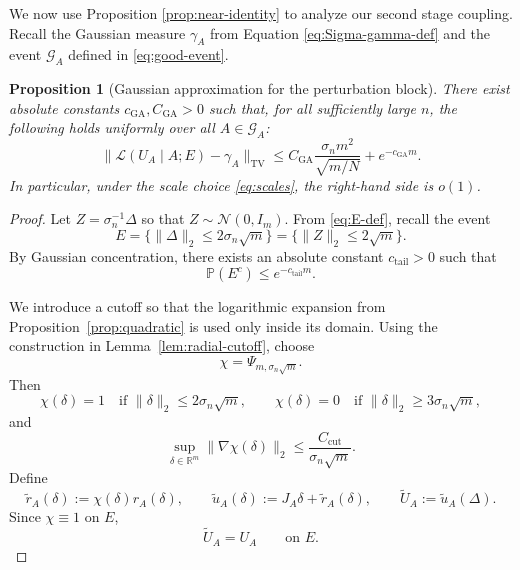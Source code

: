\documentclass[11pt, reqno]{amsart}
\numberwithin{equation}{section}
\newtheorem{proposition}{Proposition}
\theoremstyle{remark}
\newcommand{\R}{\mathbb{R}}
\newcommand{\Prob}{\mathbb{P}}
\newcommand{\1}{\mathbf{1}}
\newcommand{\Law}{\mathcal{L}}
\newcommand{\TV}{\mathrm{TV}}
\begin{document}
We now use Proposition \ref{prop:near-identity} to analyze our second stage coupling. Recall the Gaussian measure $\gamma_{A}$ from Equation \eqref{eq:Sigma-gamma-def} and the event $\mathcal G_A$ defined in \eqref{eq:good-event}.
\begin{proposition}[Gaussian approximation for the perturbation block]
\label{prop:gaussian-approx}
There exist absolute constants $c_{\mathrm{GA}},C_{\mathrm{GA}}>0$ such that, for all sufficiently large $n$, the following holds uniformly over all $A\in\mathcal G_A$:
\[
\|\Law(U_A\mid A;E)-\gamma_A\|_{\TV}
\le
C_{\mathrm{GA}}\frac{\sigma_n m^2}{\sqrt{m/N}}+e^{-c_{\mathrm{GA}}m}.
\]
In particular, under the scale choice \eqref{eq:scales}, the right-hand side is $o(1)$.
\end{proposition}
\begin{proof}
Let $Z = \sigma_{n}^{-1} \Delta$ so that $Z\sim\mathcal N(0,I_m)$. From \eqref{eq:E-def}, recall the event
\[
E=\{\|\Delta\|_2\le 2\sigma_n\sqrt m\}
=\{\|Z\|_2\le 2\sqrt m\}.
\]
By Gaussian concentration, there exists an absolute constant
$c_{\mathrm{tail}}>0$ such that
\begin{equation}
\label{eq:chi-tail-clean}
\Prob(E^c)\le e^{-c_{\mathrm{tail}}m}.
\end{equation}

We introduce a cutoff so that the logarithmic expansion from
Proposition~\ref{prop:quadratic} is used only inside its domain. Using the construction in
Lemma~\ref{lem:radial-cutoff}, choose
\[
\chi=\Psi_{m,\sigma_n\sqrt m}.
\]
Then
\[
\chi(\delta)=1 \quad \text{if } \|\delta\|_2\le 2\sigma_n\sqrt m,
\qquad
\chi(\delta)=0 \quad \text{if } \|\delta\|_2\ge 3\sigma_n\sqrt m,
\]
and
\begin{equation}
\label{eq:cutoff-grad-bound}
\sup_{\delta\in\R^m}\|\nabla\chi(\delta)\|_2
\le
\frac{C_{\mathrm{cut}}}{\sigma_n\sqrt m}.
\end{equation}
Define
\begin{equation}
\label{eq:trunc-defs-clean}
\widetilde r_A(\delta):=\chi(\delta)r_A(\delta),
\qquad
\widetilde u_A(\delta):=J_A\delta+\widetilde r_A(\delta),
\qquad
\widetilde U_A:=\widetilde u_A(\Delta).
\end{equation}
Since $\chi\equiv 1$ on $E$,
\begin{equation}
\label{eq:UA-tildeUA-on-E}
\widetilde U_A=U_A
\qquad\text{on }E.
\end{equation}


\end{proof}
\end{document}
